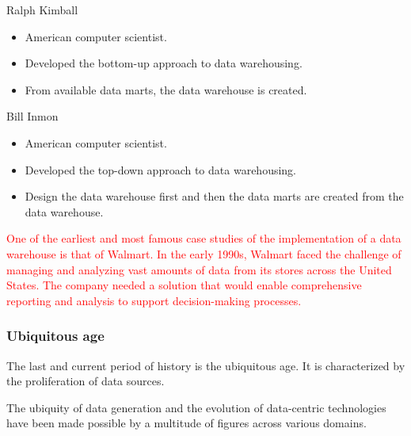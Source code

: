 \begin{mainbox}{Ralph Kimball}
  \begin{itemize}
    \item American computer scientist.
    \item Developed the bottom-up approach to data warehousing.
    \item From available data marts, the data warehouse is created.
  \end{itemize}
\end{mainbox}

\begin{mainbox}{Bill Inmon}
  \begin{itemize}
    \item American computer scientist.
    \item Developed the top-down approach to data warehousing.
    \item Design the data warehouse first and then the data marts are created from the data warehouse.
  \end{itemize}
\end{mainbox}

\textcolor{red}{
One of the earliest and most famous case studies of the implementation of a data warehouse
is that of Walmart. In the early 1990s, Walmart faced the challenge of managing and
analyzing vast amounts of data from its stores across the United States. The company
needed a solution that would enable comprehensive reporting and analysis to support
decision-making processes.
}

\subsubsection{Ubiquitous age}

The last and current period of history is the ubiquitous age.  It is characterized by the
proliferation of data sources.

The ubiquity of data generation and the evolution of data-centric technologies have been
made possible by a multitude of figures across various domains.

